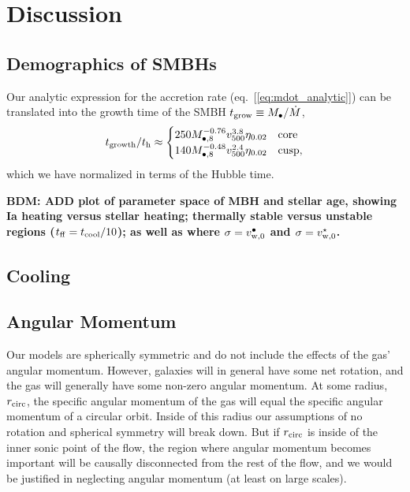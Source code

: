 \documentclass[usenatbib,fleqn]{mn2e}
\newcommand{\rcirc}{r_{\rm circ}}
\newcommand{\Mbheight}{M_{\bullet,8}}
\begin{document}
\section{Discussion}
\label{sec:discussion}

\subsection{Demographics of SMBHs}

Our analytic expression for the accretion rate (eq.~[\ref{eq:mdot_analytic}]) can be translated into the growth time of the SMBH $t_{\rm grow} \equiv M_{\bullet}/\dot{M}$,
\begin{eqnarray}
  t_{\rm growth}/t_{\rm h} \approx 
  \begin{cases}
    250 M_{\bullet,8}^{-0.76}
    v_{500}^{3.8}   \eta_{0.02}  & \text{core} \\
    140 \Mbheight^{-0.48}
    v_{500}^{2.4}   \eta_{0.02}  & \text{cusp}, 
  \end{cases}
  \label{eq:tgrow_analytic}
\end{eqnarray}
which we have normalized in terms of the Hubble time.  

{\bf BDM: ADD plot of parameter space of MBH and stellar age, showing Ia heating versus stellar heating; thermally stable versus unstable regions ($t_{\rm ff} = t_{\rm cool}/10$); as well as where $\sigma = v_{\rm w,0}^{\bullet}$ and $\sigma = v_{\rm w,0}^{\star}$.  }

\subsection{Cooling}
\label{sec:cooling}

  \subsection{Angular Momentum}
  \label{sec:ang}
  Our models are spherically symmetric and do not include the effects of
  the gas' angular momentum. However, galaxies will in general have some
  net rotation, and the gas will generally have some non-zero angular
  momentum. At some radius, $\rcirc$, the specific angular momentum of
  the gas will equal the specific angular momentum of a circular
  orbit. Inside of this radius our assumptions of no rotation and
  spherical symmetry will break down. But if $\rcirc$ is inside of the
  inner sonic point of the flow, the region where angular momentum
  becomes important will be causally disconnected from the rest of the
  flow, and we would be justified in neglecting angular momentum (at
  least on large scales).
\end{document}
